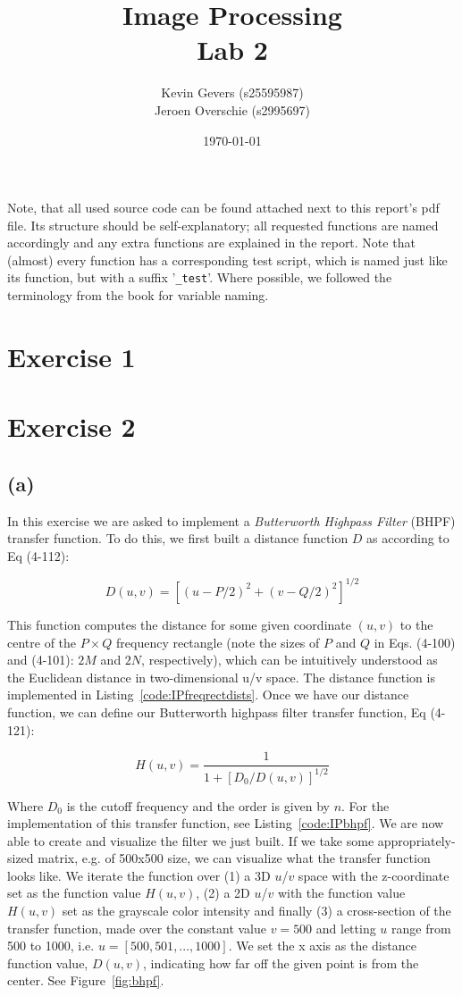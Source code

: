 \documentclass{article}
\title{Image Processing\\
    Lab 2}
\author{Kevin Gevers (s25595987) \\ Jeroen Overschie (s2995697)}
\date{\today}
\begin{document}
\maketitle

Note, that all used source code can be found attached next to this report's pdf file. Its structure should be self-explanatory; all requested functions are named accordingly and any extra functions are explained in the report. Note that (almost) every function has a corresponding test script, which is named just like its function, but with a suffix '\texttt{\_test}'. Where possible, we followed the terminology from the book \citep{gonzalez2008digital} for variable naming.

\section*{Exercise 1}

\section*{Exercise 2}
\subsection*{(a)} In this exercise we are asked to implement a \textit{Butterworth Highpass Filter} (BHPF) transfer function. To do this, we first built a distance function $D$ as according to Eq (4-112):

\[
D(u,v)=[(u-P/2)^2+(v-Q/2)^2]^{1/2}
\]

This function computes the distance for some given coordinate $(u, v)$ to the centre of the $P \times Q$ frequency rectangle (note the sizes of $P$ and $Q$ in Eqs. (4-100) and (4-101): $2M$ and $2N$, respectively), which can be intuitively understood as the Euclidean distance in two-dimensional u/v space. The distance function is implemented in  Listing~\ref{code:IPfreqrectdists}. Once we have our distance function, we can define our Butterworth highpass filter transfer function, Eq (4-121):

\[
H(u, v) = \frac{1}{1+[D_0 / D(u, v)]^{1/2}}
\]

Where $D_0$ is the cutoff frequency and the order is given by $n$. For the implementation of this transfer function, see  Listing~\ref{code:IPbhpf}. We are now able to create and visualize the filter we just built. If we take some appropriately-sized matrix, e.g. of 500x500 size, we can visualize what the transfer function looks like. We iterate the function over (1) a 3D $u$/$v$ space with the z-coordinate set as the function value $H(u, v)$, (2) a 2D $u$/$v$ with the function value $H(u, v)$ set as the grayscale color intensity and finally (3) a cross-section of the transfer function, made over the constant value $v = 500$ and letting $u$ range from 500 to 1000, i.e. $u = [500, 501, ..., 1000]$. We set the x axis as the distance function value, $D(u, v)$, indicating how far off the given point is from the center. See Figure~\ref{fig:bhpf}.
\end{document}
